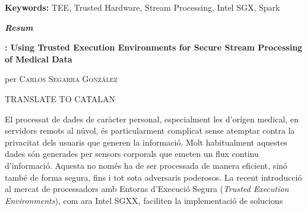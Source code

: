 \vspace{0.5cm}

\textbf{Keywords:} TEE, Trusted Hardware, Stream Processing, Intel SGX, Spark

\vfill
\pagebreak

\vspace*{2cm}
\begin{center}
%
%
%
%
%
%    
%
    \LARGE
    \textit{\textbf{Resum}} 

    \vspace{0.5cm}

    \large
    \textbf{\projName: Using Trusted Execution Environments for Secure Stream Processing of Medical Data}

    per \textsc{Carlos Segarra Gonz\'alez}
\end{center}

\vspace{0.5cm}

\normalsize
TRANSLATE TO CATALAN %

El processat de dades de car\`acter personal, especialment les d'or\'igen medical, en servidors remots al n\'uvol, \'es particularment complicat sense atemptar contra la privacitat dels usuaris que generen la informaci\'o.
Molt habitualment aquestes dades s\'on generades per sensors corporals que emeten un flux continu d'informaci\'o. Aquesta no nom\'es ha de ser processada de manera eficient, sin\'o tamb\'e de forma segura, fins i tot sota adversaris poderosos.
La recent introducci\'o al mercat de processadors amb Entorns d'Execuci\'o Segura (\textit{Trusted Execution Environments}), com ara Intel SGXX, faciliten la implementaci\'o de solucions 
    
